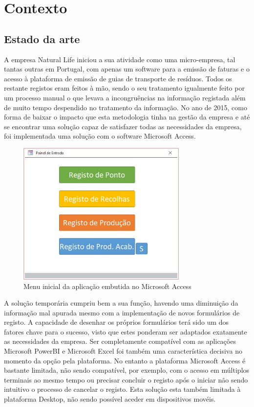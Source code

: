 \chapter{Contexto} 
\label{cap:2}

\section{Estado da arte}
A empresa Natural Life iniciou a sua atividade como uma micro-empresa, tal tantas outras em Portugal, com apenas um software para a emissão de faturas e o acesso à plataforma de emissão de guias de transporte de resíduos. Todos os restante registos eram feitos à mão, sendo o seu tratamento igualmente feito por um processo manual o que levava a incongruências na informação registada além de muito tempo despendido no tratamento da informação.
No ano de 2015, como forma de baixar o impacto que esta metodologia tinha na gestão da empresa e até se encontrar uma solução capaz de satisfazer todas as necessidades da empresa, foi implementada uma solução com o software Microsoft Access.

\begin{figure}[ht] 
    \begin{center}
    \includegraphics[width=0.75\textwidth,keepaspectratio]{figuras/AppAccess/0-MenuInicial.jpg}
    \caption{Menu inicial da aplicação embutida no Microsoft Access}\label{fig:app access home} 
    \end{center}
\end{figure}

A solução temporária cumpriu bem a sua função, havendo uma diminuição da informação mal apurada mesmo com a implementação de novos formulários de registo. A capacidade de desenhar os próprios formulários terá sido um dos fatores chave para o sucesso, visto que estes ponderam ser adaptados exatamente as necessidades da empresa. Ser completamente compatível com as aplicações Microsoft PowerBI e Microsoft Excel foi também uma característica decisiva no momento da opção pela plataforma. No entanto a plataforma Microsoft Access é bastante limitada, não sendo compatível, por exemplo, com o acesso em múltiplos terminais ao mesmo tempo ou precisar concluir o registo após o iniciar não sendo intuitivo o processo de cancelar o registo. Esta solução esta também limitada à plataforma Desktop, não sendo possível aceder em dispositivos movéis.


